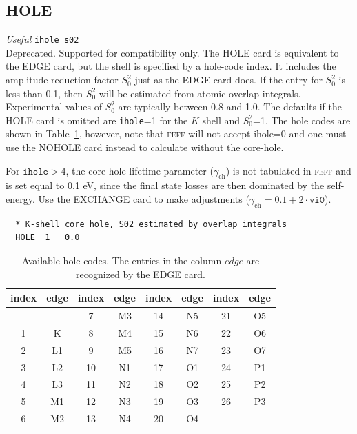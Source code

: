 \documentclass[11pt,oneside]{report} %
\renewcommand{\htmlref}[2]{\hyperlink{#2}{#1}}
\newcommand{\program}[1]{\textsc{#1}}
\newcommand{\feff}{\program{feff}}
\newenvironment{Card}[4]%
      {\vspace{3ex}%
        \subsection{#1}
        \quad\textsl{#3}\newline
        \quad\texttt{#2}\newline%
        \label{card:#4}\\}
      {}
\renewcommand{\htmlref}[2]{{#1}} %
\begin{document}
\begin{Card}{HOLE}{ihole s02}{Useful}{hol}
  Deprecated.  Supported for compatibility only.  The HOLE card is equivalent to the EDGE card, but the shell is specified
  by a hole-code index. It includes the amplitude reduction factor $S_0^2$
  just as the EDGE card does. If the entry for $S_0^2$ is less than 0.1,
  then $S_0^2$ will be estimated from atomic overlap
  integrals. Experimental values of $S_0^2$ are typically
  between 0.8 and 1.0. The defaults if the HOLE card is omitted are
  \texttt{ihole}=1 for the $K$ shell and $S_0^2$=1. The hole codes
  are shown in Table~\ref{tab:holecodes}, however, note that {\feff}
  will not accept ihole=0 and one must use the \htmlref{NOHOLE}{card:noh} 
  card instead to calculate without the core-hole.

  For $\texttt{ihole}>4$, the core-hole lifetime parameter
  ($\gamma_{\textrm{ch}}$) is not tabulated in {\feff} and is set
  equal to 0.1 eV, since the final state losses are then dominated by
  the self-energy. Use the \htmlref{EXCHANGE}{card:exc} card to make
  adjustments ($\gamma_{\textrm{ch}} = 0.1 + 2\cdot\mathtt{vi0}$).

\begin{verbatim}
  * K-shell core hole, S02 estimated by overlap integrals
  HOLE  1   0.0
\end{verbatim}
\end{Card}



\begin{table}[htbp]
  \begin{center}
    \begin{tabular}[h]{|c>{\ttfamily}c|c>{\ttfamily}c|c>{\ttfamily}c|c>{\ttfamily}c|}
      \hline
      index & \textrm{edge} & index & \textrm{edge} & index &
      \textrm{edge} & index & \textrm{edge} \\
      \hline
      -  & -- & 7  & M3 & 14 & N5 & 21 & O5 \\
      1  & K  & 8  & M4 & 15 & N6 & 22 & O6 \\
      2  & L1 & 9  & M5 & 16 & N7 & 23 & O7 \\
      3  & L2 & 10 & N1 & 17 & O1 & 24 & P1 \\
      4  & L3 & 11 & N2 & 18 & O2 & 25 & P2 \\
      5  & M1 & 12 & N3 & 19 & O3 & 26 & P3 \\
      6  & M2 & 13 & N4 & 20 & O4 &    &    \\
      \hline
    \end{tabular}
    \caption[Available hole codes]{Available hole codes. The entries
      in the column $edge$ are recognized by the EDGE card.}
    \label{tab:holecodes}
  \end{center}
\end{table}
\end{document}
